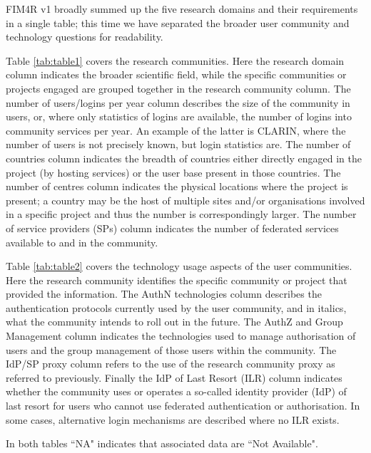 \documentclass[fleqn,10pt]{wlscirep}
\begin{document}
{FIM4R v1 broadly summed up the five research domains and their requirements in a single table; this time we have separated the broader user community and technology questions for readability.

Table \ref{tab:table1} covers the research communities. Here the research domain column indicates the broader scientific field, while the specific communities or projects engaged are grouped together in the research community column. The number of users/logins per year column describes the size of the community in users, or, where only statistics of logins are available, the number of logins into community services per year. An example of the latter is CLARIN, where the number of users is not precisely known, but login statistics are. The number of countries column indicates the breadth of countries either directly engaged in the project (by hosting services) or the user base present in those countries. The number of centres column indicates the physical locations where the project is present; a country may be the host of multiple sites and/or organisations involved in a specific project and thus the number is correspondingly larger. The number of service providers (SPs) column indicates the number of federated services available to and in the community.

Table \ref{tab:table2} covers the technology usage aspects of the user communities. Here the research community identifies the specific community or project that provided the information. The AuthN technologies column describes the authentication protocols currently used by the user community, and in italics, what the community intends to roll out in the future. The AuthZ and Group Management column indicates the technologies used to manage authorisation of users and the group management of those users within the community. The IdP/SP proxy column refers to the use of the research community proxy as referred to previously. Finally the IdP of Last Resort (ILR) column indicates whether the community uses or operates a so-called identity provider (IdP) of last resort for users who cannot use federated authentication or authorisation. In some cases, alternative login mechanisms are described where no ILR exists.

In both tables ``NA" indicates that associated data are ``Not Available".

}
\end{document}
